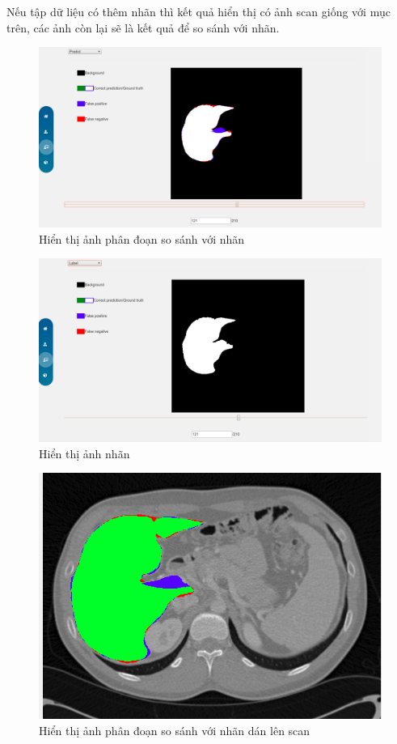 Nếu tập dữ liệu có thêm nhãn thì kết quả hiển thị có ảnh scan giống với mục trên, các ảnh còn lại sẽ là kết quả để so sánh với nhãn.
\begin{figure}[h]
\centering
    \includegraphics[totalheight=7cm]{Images/app_showscanompare.png}
    \caption{Hiển thị ảnh phân đoạn so sánh với nhãn}
    \label{skip_conn}
\end{figure}
\begin{figure}[h]
\centering
    \includegraphics[totalheight=7cm]{Images/app_labelreal.png}
    \caption{Hiển thị ảnh nhãn}
    \label{skip_conn}
\end{figure}
\begin{figure}[h]
\centering
    \includegraphics[totalheight=7cm]{Images/app_overlap_2.png}
    \caption{Hiển thị ảnh phân đoạn so sánh với nhãn dán lên scan}
    \label{skip_conn}
\end{figure}

